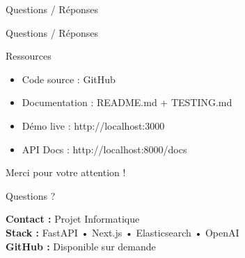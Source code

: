 \documentclass[11pt]{beamer}
\begin{document}
\begin{frame}{Questions / Réponses}
\begin{center}

\vspace{1cm}

\Large{Questions / Réponses}

\vspace{1cm}

\end{center}

\begin{block}{Ressources}
\begin{itemize}
    \item Code source : GitHub
    \item Documentation : README.md + TESTING.md
    \item Démo live : http://localhost:3000
    \item API Docs : http://localhost:8000/docs
\end{itemize}
\end{block}
\end{frame}

\begin{frame}
\begin{center}
\Huge{Merci pour votre attention !}

\vspace{1cm}

\Large{Questions ?}

\vspace{1cm}

\normalsize
\textbf{Contact :} Projet Informatique\\
\textbf{Stack :} FastAPI • Next.js • Elasticsearch • OpenAI\\
\textbf{GitHub :} Disponible sur demande
\end{center}
\end{frame}
\end{document}
